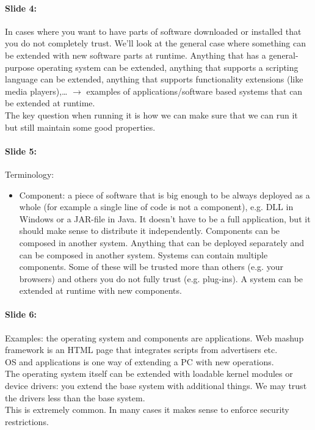 \documentclass[10pt,a4paper]{report}
\begin{document}
\paragraph{Slide 4:} In cases where you want to have parts of software downloaded or installed that you do not completely trust. We'll look at the general case where something can be extended with new software parts at runtime. Anything that has a general-purpose operating system can be extended, anything that supports a scripting language can be extended, anything that supports functionality extensions (like media players),… $\rightarrow$ examples of applications/software based systems that can be extended at runtime.\\
The key question  when running it is how we can make sure that we can run it but still maintain some good properties.

\paragraph{Slide 5:} Terminology:
\begin{itemize}
\item Component: a piece of software that is big enough to be always deployed as a whole (for example a single line of code is not a component), e.g. DLL in Windows or a JAR-file in Java. It doesn't have to be a full application, but it should make sense to distribute it independently. Components can be composed in another system. Anything that can be deployed separately and can be composed in another system. Systems can contain multiple components. Some of these will be trusted more than others (e.g. your browsers) and others you do not fully trust (e.g. plug-ins). A system can be extended at runtime with new components. 
\end{itemize}	
	
\paragraph{Slide 6:} Examples: the operating system and components are applications. Web mashup framework is an HTML page that integrates scripts from advertisers etc. \\
OS and applications is one way of extending a PC with new operations.\\
The operating system itself can be extended with loadable kernel modules or device drivers: you extend the base system with additional things. We may trust the drivers less than the base system.\\
This is extremely common. In many cases it makes sense to enforce security restrictions.
\end{document}
